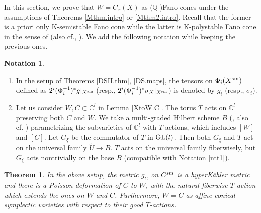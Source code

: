 \documentclass[12pt,a4paper]{amsart}
\newtheorem{Thm}{Theorem}[section]
\theoremstyle{remark}
\theoremstyle{definition}
\newtheorem{ntt}{Notation}
\def\C{\mathbb{C}}
\def\Q{\mathbb{Q}}
\begin{document}
In this section, we prove that $W=C_x(X)$ 
as ($\Q$-)Fano cones under the assumptions of Theorems \ref{Mthm.intro} 
or \ref{Mthm2.intro}. 
Recall that the former is a priori only 
K-semistable Fano cone while the latter is 
K-polystable Fano cone in the sense of \cite{CS, CS2} (also cf., 
\cite[\S 2]{Od24a}). 
We add the following notation 
while keeping the previous ones. 

\begin{ntt}\label{ntt5}
\begin{enumerate}
    \item 
In the setup of Theorems \ref{DSII.thm},  \ref{DS.maps}, 
the tensors  on $\Phi_i(X^{\rm sm})$ 
defined as $2^i(\Phi_i^{-1})^* g|_{X^{\rm sm}}$ 
(resp., $2^i(\Phi_i^{-1})^* \sigma_X|_{X^{\rm sm}}$) 
is denoted by 
$g_i$ (resp., $\sigma_i$). 

\item 
Let us consider $W, C\subset \C^l$ in 
Lemma \ref{XtoW.C}. The torus $T$ acts on $\C^l$ preserving both $C$ and $W$.    
We take a multi-graded Hilbert scheme $B$ 
(\cite{HaiStu}, also cf. \cite[\S 3.3]{DSII}) 
parametrizing the subvarieties of $\C^l$ with $T$-actions, which includes $[W]$ and $[C]$. 
Let $G_\xi$ be the commutator of $T$ in ${\rm GL}(l)$. 
Then both $G_{\xi}$ and $T$ act on the 
universal family $\tilde{U} \to B$.  $T$ acts on the universal family fiberwisely, but $G_{\xi}$ acts nontrivially on the base $B$ (compatible with Notation \ref{ntt1}). 

\end{enumerate}
\end{ntt}

\begin{Thm}\label{ssps}
In the above setup, the metric $g_C$ on $C^{\rm sm}$ 
is a hyperK\"ahler metric and 
there is a Poisson deformation of 
$C$ to $W$, with the natural 
fiberwise $T$-action which extends the ones on $W$ and $C$. 
Furthermore, $W=C$ as affine conical symplectic varieties with respect to their good 
$T$-actions. 
 
\end{Thm}
\end{document}
